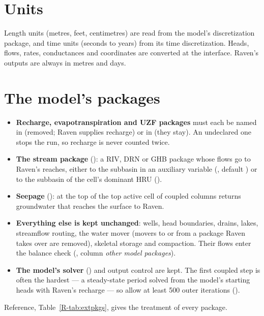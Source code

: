 \section{Units}
Length units (metres, feet, centimetres) are read from the model's discretization package, and time units (seconds to
years) from its time discretization. Heads, flows, rates, conductances and coordinates are converted at the interface.
Raven's outputs are always in metres and days.

\section{The model's packages}
\begin{itemize}
\item \textbf{Recharge, evapotranspiration and UZF packages} must each be named in  (removed; Raven
supplies recharge) or in  (they stay). An undeclared one stops the run, so recharge is never counted
twice.
\item \textbf{The stream package} (): a RIV, DRN or GHB package whose flows go to Raven's reaches,
either to the subbasin in an auxiliary variable (, default ) or to the subbasin of the cell's
dominant HRU ().
\item \textbf{Seepage} ():  at the top of the top active cell of coupled columns
returns groundwater that reaches the surface to Raven.
\item \textbf{Everything else is kept unchanged}: wells, head boundaries, drains, lakes, streamflow routing, the water
mover (movers to or from a package Raven takes over are removed), skeletal storage and compaction. Their flows enter
the balance check (, column \emph{other model packages}).
\item \textbf{The model's solver} () and output control are kept. The first coupled step is often the hardest
--- a steady-state period solved from the model's starting heads with Raven's recharge --- so allow at least 500 outer
iterations ().
\end{itemize}
Reference, Table~\ref{R-tab:extpkgs}, gives the treatment of every package.

